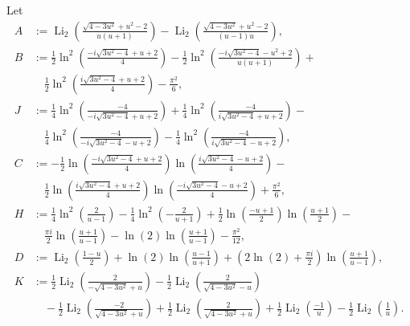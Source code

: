 \documentclass[10pt,a4paper]{amsart}
\begin{document}
\begin{theorem}\label{maintheorem}
 Let 
\begin{align*}
 A & := \operatorname{Li}_2\left(\frac{\sqrt{4 - 3u^2} + u^2 - 2}{u (u + 1)}\right) 
 - \operatorname{Li}_2\left(\frac{\sqrt{4 - 3u^2} + u^2 - 2}{(u - 1) u}\right), \\ 
 B & := 
 \frac{1}{2} \ln^2\left(\frac{-i \sqrt{3 u^2-4}+u+2}{4} \right) - 
 \frac{1}{2} \ln ^2\left(\frac{- i \sqrt{3 u^2 - 4} - u^2 +2}{u 
 (u+1)}\right) + \\ 
 & \quad \frac{1}{2} \ln ^2\left(\frac{i \sqrt{3 u^2 - 4} + u + 2}{4} \right)-\frac{\pi ^2}{6}, \\ 
 J & := \frac{1}{4} \ln^2 \left( \frac{-4}{-i \sqrt{3 u^2 - 4} + u + 2} \right) + 
 \frac{1}{4} \ln^2 \left( \frac{-4}{i \sqrt{3 u^2 - 4} + u + 2} \right) - \\ 
 &\quad \frac{1}{4} \ln^2 \left( \frac{-4}{-i \sqrt{3 u^2 - 4} - u + 2} \right) - \frac{1}{4} 
 \ln^2 \left( \frac{-4}{i \sqrt{3 u^2 - 4} - u + 2} \right), \\ 
 C & := - \frac{1}{2} \ln \left( \frac{ - i \sqrt{3 u^2 - 4} + u + 
 2}{4} \right) \ln \left( \frac{ i \sqrt{3 u^2 - 4} - u + 2}{4} \right) - \\ 
 & \quad \frac{1}{2} \ln \left( \frac{i \sqrt{3 u^2 - 4} + u + 2}{4} \right) 
 \ln \left( \frac{- i \sqrt{3 u^2 - 4} - u + 2}{4} \right) + \frac{\pi^2}{6}, \\ 
 H & := 
 \frac{1}{4} \ln^2\left(\frac{2}{u-1}\right)-\frac{1}{4} \ln ^2\left(-\frac{2}{u+1}\right)+\frac{1}{2} \ln \left(\frac{-u + 1}{2} \right) 
 \ln \left(\frac{u+1}{2}\right) - \\ 
 & \quad \frac{\pi i}{2} \ln \left(\frac{u + 
 1}{u-1}\right)-\ln (2) \ln \left(\frac{u+1}{u-1}\right)-\frac{\pi^2}{12}, \\ 
 D & := \operatorname{Li}_2 \left( \frac{1 - u}{2} \right) 
 + \ln(2) \ln \left( \frac{u - 1}{u + 1} \right) + \left( 2 \ln(2) + \frac{\pi i}{2} \right) \ln \left( \frac{u + 
 1}{u - 1} \right), \\ 
 K & := \frac{1}{2} \operatorname{Li}_2 \left( \frac{2}{- \sqrt{4 - 3 u^2} + u} \right) - 
 \frac{1}{2} \operatorname{Li}_2 \left( \frac{2}{\sqrt{4 - 3 u^2} - u} \right) \\ 
 &\quad - \frac{1}{2} \operatorname{Li}_2 \left( \frac{-2}{\sqrt{4 - 3 u^2} + u} \right) + 
 \frac{1}{2} \operatorname{Li}_2 \left( \frac{2}{\sqrt{4 - 3 u^2} + u} \right) + 
 \frac{1}{2} \operatorname{Li}_2 \left( \frac{-1}{u} \right) - 
 \frac{1}{2} \operatorname{Li}_2 \left( \frac{1}{u} \right). 

\end{align*}
\end{theorem}
\end{document}
